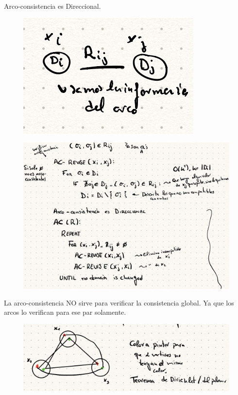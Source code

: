 \documentclass[12pt, twoside, openright]{report} %
\begin{document}
    Arco-consistencia es Direccional.
	\begin{figure}[H]
		{\includegraphics[scale=.5]{Untitled 37.png}}
	\end{figure}
	\begin{figure}[H]
		{\includegraphics[scale=.2]{Untitled 38.png}}
	\end{figure}
	\pagebreak
	La arco-consistencia NO sirve para verificar la consistencia global.
    Ya que los arcos lo verifican para ese par solamente.
	\begin{figure}[H]
		{\includegraphics[scale=.35]{Untitled 39.png}}
	\end{figure}
\end{document}
